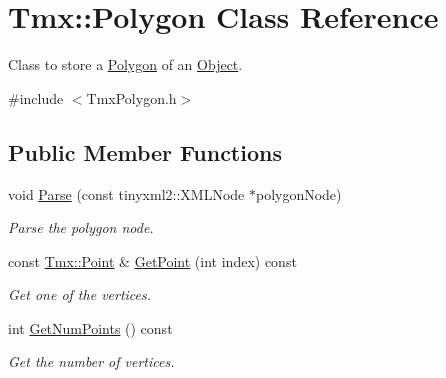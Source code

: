 \hypertarget{classTmx_1_1Polygon}{\section{Tmx\-:\-:Polygon Class Reference}
\label{classTmx_1_1Polygon}
}


Class to store a \hyperlink{classTmx_1_1Polygon}{Polygon} of an \hyperlink{classTmx_1_1Object}{Object}.  




{\ttfamily \#include $<$Tmx\-Polygon.\-h$>$}

\subsection*{Public Member Functions}
\begin{DoxyCompactItemize}
\item 
\hypertarget{classTmx_1_1Polygon_a4d4f38e3f1db96cb02a09636559d63de}{void \hyperlink{classTmx_1_1Polygon_a4d4f38e3f1db96cb02a09636559d63de}{Parse} (const tinyxml2\-::\-X\-M\-L\-Node $\ast$polygon\-Node)}\label{classTmx_1_1Polygon_a4d4f38e3f1db96cb02a09636559d63de}

\begin{DoxyCompactList}\small\item\em Parse the polygon node. \end{DoxyCompactList}\item 
\hypertarget{classTmx_1_1Polygon_aec32fbd6874273145cc874bf0068fe61}{const \hyperlink{structTmx_1_1Point}{Tmx\-::\-Point} \& \hyperlink{classTmx_1_1Polygon_aec32fbd6874273145cc874bf0068fe61}{Get\-Point} (int index) const }\label{classTmx_1_1Polygon_aec32fbd6874273145cc874bf0068fe61}

\begin{DoxyCompactList}\small\item\em Get one of the vertices. \end{DoxyCompactList}\item 
\hypertarget{classTmx_1_1Polygon_a708ce0f1008079468323126549a3108f}{int \hyperlink{classTmx_1_1Polygon_a708ce0f1008079468323126549a3108f}{Get\-Num\-Points} () const }\label{classTmx_1_1Polygon_a708ce0f1008079468323126549a3108f}

\begin{DoxyCompactList}\small\item\em Get the number of vertices. \end{DoxyCompactList}\end{DoxyCompactItemize}


